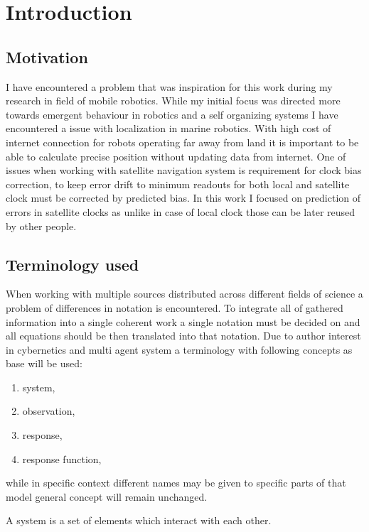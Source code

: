 \chapter{Introduction}

\section{Motivation}
I have encountered a problem that was inspiration for this work during my research in field
of mobile robotics. While my initial focus was directed more towards emergent behaviour in 
robotics and a self organizing systems I have encountered a issue with localization in marine 
robotics. With high cost of internet connection for robots operating far away from land it 
is important to be able to calculate precise position without updating data from internet.
One of issues when working with satellite navigation system is requirement for clock bias
correction, to keep error drift to minimum readouts for both local and satellite clock must
be corrected by predicted bias. In this work I focused on prediction of errors in satellite
clocks as unlike in case of local clock those can be later reused by other people.

\section{Terminology used}
When working with multiple sources distributed across different fields of science a problem of 
differences in notation is encountered. To integrate all of gathered information into a single 
coherent work a single notation must be decided on and all equations should be then translated
into that notation.
Due to author interest in cybernetics and multi agent system a terminology with following 
concepts as base will be used:
\begin{enumerate}
	\item system,
	\item observation,
	\item response,
	\item response function,
\end{enumerate}
while in specific context different names may be given to specific parts of that model general
concept will remain unchanged.

\begin{definition}[System]
	A system is a set of elements which interact with each other.
\end{definition}
